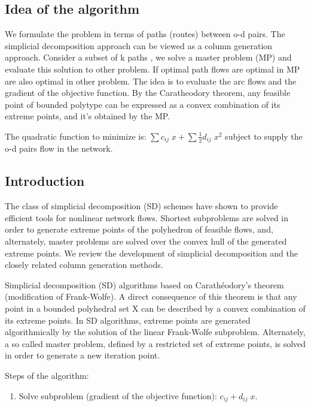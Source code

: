 \documentclass[]{article}
\providecommand{\tightlist}{%
  \setlength{\itemsep}{0pt}\setlength{\parskip}{0pt}}
\begin{document}
\subsection{Idea of the algorithm}\label{idea-of-the-algorithm}

We formulate the problem in terms of paths (routes) between o-d pairs.
The simplicial decomposition approach can be viewed as a column
generation approach. Consider a subset of k paths , we solve a master
problem (MP) and evaluate this solution to other problem. If optimal
path flows are optimal in MP are also optimal in other problem. The idea
is to evaluate the arc flows and the gradient of the objective function.
By the Caratheodory theorem, any feasible point of bounded polytype can
be expressed as a convex combination of its extreme points, and it's
obtained by the MP.

The quadratic function to minimize is:
\(\displaystyle \sum c_{ij}\;x + \displaystyle \sum \frac{1}{2} d_{ij} \;x^2\)
subject to supply the o-d pairs flow in the network.

\subsection{Introduction}\label{introduction-1}

The class of simplicial decomposition (SD) schemes have shown to provide
eﬃcient tools for nonlinear network ﬂows. Shortest subproblems are
solved in order to generate extreme points of the polyhedron of feasible
ﬂows, and, alternately, master problems are solved over the convex hull
of the generated extreme points. We review the development of simplicial
decomposition and the closely related column generation methods.

Simplicial decomposition (SD) algorithms based on Carathéodory's theorem
(modification of Frank-Wolfe). A direct consequence of this theorem is
that any point in a bounded polyhedral set X can be described by a
convex combination of its extreme points. In SD algorithms, extreme
points are generated algorithmically by the solution of the linear
Frank-Wolfe subproblem. Alternately, a so called master problem, deﬁned
by a restricted set of extreme points, is solved in order to generate a
new iteration point.

Steps of the algorithm:

\begin{enumerate}
\def\labelenumi{\arabic{enumi})}
\tightlist
\item
  Solve subproblem (gradient of the objective function):
  \(c_{ij} + d_{ij}\;x\).
\end{enumerate}
\end{document}
